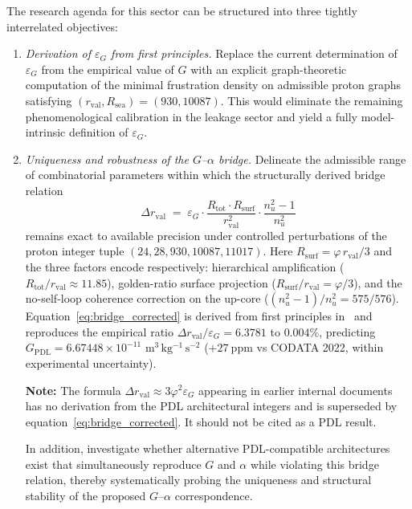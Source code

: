 \documentclass[11pt,a4paper]{article}
\begin{document}
The research agenda for this sector can be structured into three tightly interrelated objectives:
\begin{enumerate}[label=(\roman*), leftmargin=*]
  \item \emph{Derivation of $\varepsilon_G$ from first principles.}  Replace the current determination of $\varepsilon_G$ from the empirical value of $G$ with an explicit graph-theoretic computation of the minimal frustration density on admissible proton graphs satisfying $(r_{\mathrm{val}},R_{\mathrm{sea}})=(930,10087)$. This would eliminate the remaining phenomenological calibration in the leakage sector and yield a fully model-intrinsic definition of $\varepsilon_G$.
  
  \item \emph{Uniqueness and robustness of the $G$--$\alpha$ bridge.} Delineate the admissible range of combinatorial parameters within which the structurally derived bridge relation
  \begin{equation}
  \Delta r_{\mathrm{val}} \;=\; \varepsilon_G \cdot \frac{R_{\mathrm{tot}}\cdot R_{\mathrm{surf}}}{r_{\mathrm{val}}^2} \cdot \frac{n_u^2-1}{n_u^2}
  \label{eq:bridge_corrected}
  \end{equation}
  remains exact to available precision under controlled perturbations of the proton integer tuple $(24,28,930,10087,11017)$. Here $R_{\mathrm{surf}} = \varphi\,r_{\mathrm{val}}/3$ and the three factors encode respectively: hierarchical amplification ($R_{\mathrm{tot}}/r_{\mathrm{val}} \approx 11.85$), golden-ratio surface projection ($R_{\mathrm{surf}}/r_{\mathrm{val}} = \varphi/3$), and the no-self-loop coherence correction on the up-core ($(n_u^2-1)/n_u^2 = 575/576$). Equation~\eqref{eq:bridge_corrected} is derived from first principles in~\citep{Universal_Coherence_Leakage_V3_2026} and reproduces the empirical ratio $\Delta r_{\mathrm{val}}/\varepsilon_G = 6.3781$ to $0.004\%$, predicting $G_{\mathrm{PDL}} = 6.67448\times10^{-11}$ $\mathrm{m^3\,kg^{-1}\,s^{-2}}$ ($+27~\mathrm{ppm}$ vs CODATA 2022, within experimental uncertainty). 
  
  \textbf{Note:} The formula $\Delta r_{\mathrm{val}} \approx 3\varphi^2\varepsilon_G$ appearing in earlier internal documents has no derivation from the PDL architectural integers and is superseded by equation~\eqref{eq:bridge_corrected}. It should not be cited as a PDL result.
  
  In addition, investigate whether alternative PDL-compatible architectures exist that simultaneously reproduce $G$ and $\alpha$ while violating this bridge relation, thereby systematically probing the uniqueness and structural stability of the proposed $G$--$\alpha$ correspondence.
  

\end{enumerate}
\end{document}
